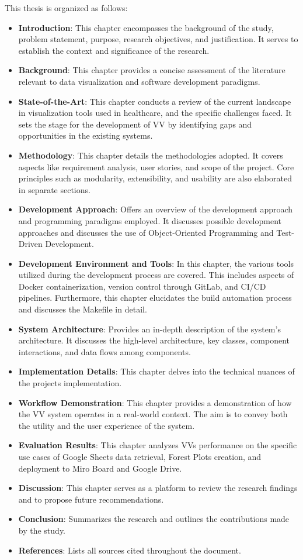 This thesis is organized as follows:

\begin{itemize}
\item
  \textbf{Introduction}: This chapter encompasses the background of the
  study, problem statement, purpose, research objectives, and
  justification. It serves to establish the context and significance of
  the research.
\item
  \textbf{Background}: This chapter provides a concise assessment of the
  literature relevant to data visualization and software development paradigms.
\item
\textbf{State-of-the-Art}: This chapter conducts a review of the current landscape in visualization tools used in healthcare, and the specific challenges faced. It sets the stage for the development of VV by identifying gaps and opportunities in the existing systems.
\item
  \textbf{Methodology}: This chapter details the methodologies adopted.
  It covers aspects like requirement analysis, user stories, and scope
  of the project. Core principles such as modularity, extensibility, and
  usability are also elaborated in separate sections.
\item
  \textbf{Development Approach}: Offers an overview of the development
  approach and programming paradigms employed. It discusses possible
  development approaches and discusses the use of Object-Oriented
  Programming and Test-Driven Development.
\item
  \textbf{Development Environment and Tools}: In this chapter, the
  various tools utilized during the development process are covered. This includes aspects of Docker containerization, version
  control through GitLab, and CI/CD pipelines. Furthermore, this chapter
  elucidates the build automation process and discusses the Makefile in
  detail.
\item
  \textbf{System Architecture}: Provides an in-depth description of the
  system's architecture. It discusses the high-level architecture, key
  classes, component interactions, and data flows among components.
\item
  \textbf{Implementation Details}: This chapter delves into the
  technical nuances of the project\textquotesingle s implementation.
\item
  \textbf{Workflow Demonstration}: This chapter provides a demonstration
  of how the VV system operates in a real-world context. The aim is to
  convey both the utility and the user experience of the system.
\item
  \textbf{Evaluation Results}: This chapter analyzes
  VV\textquotesingle s performance on the specific use cases of Google
  Sheets data retrieval, Forest Plots creation, and deployment to Miro
  Board and Google Drive.
\item
  \textbf{Discussion}: This chapter serves as a platform to review the
  research findings and to propose future recommendations.
\item
  \textbf{Conclusion}: Summarizes the research and outlines the
  contributions made by the study.
\item
  \textbf{References}: Lists all sources cited throughout the document.
\end{itemize}
